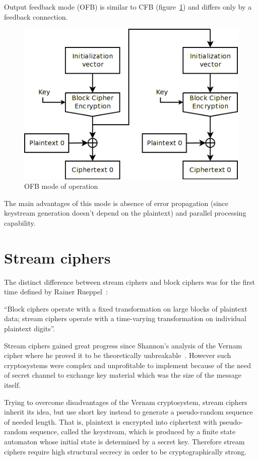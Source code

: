 Output feedback mode (OFB) is similar to CFB (figure~\ref{fig:mode-ofb}) and
differs only by a feedback connection.
\begin{figure}[htbp]
	\centering
	\includegraphics[scale=0.6]{images/modes_ofb}
	\caption{OFB mode of operation}
	\label{fig:mode-ofb}
\end{figure}
The main advantages of this mode is
absence of error propagation (since keystream generation doesn't depend on the
plaintext) and parallel processing capability.

\section{Stream ciphers}

The distinct difference between stream ciphers and block ciphers was for the
first time defined by Rainer Rueppel~\cite{robshaw:rsa:streamciphers}:

``Block ciphers operate with a fixed transformation on large blocks of
plaintext data; stream ciphers operate with a time-varying transformation on
individual plaintext digits''.

Stream ciphers gained great progress since Shannon's analysis of the
Vernam cipher where he proved it to be theoretically
unbreakable~\cite{shannon:secrecy}. However such cryptosystems were complex and
unprofitable to implement because of the need of secret channel to exchange key
material which was the size of the message itself.

Trying to overcome disadvantages of the Vernam cryptosystem, stream ciphers
inherit its idea, but use short key instead to generate a pseudo-random sequence
of needed length. That is, plaintext is encrypted into ciphertext with
pseudo-random sequence,  called the keystream, which is produced by a finite
state automaton whose initial state is determined by a secret key. Therefore
stream ciphers require high structural secrecy in order to be cryptographically
strong.

